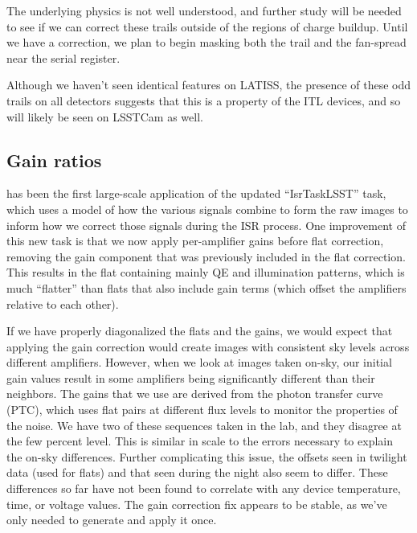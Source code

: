 The underlying physics is not well understood, and further study will be needed to see if we can correct these trails outside of the regions of charge buildup.
Until we have a correction, we plan to begin masking both the trail and the fan-spread near the serial register.

Although we haven't seen identical features on LATISS, the presence of these odd trails on all \ComCam detectors suggests that this is a property of the ITL devices, and so will likely be seen on LSSTCam as well.


\subsection{Gain ratios}

\ComCam has been the first large-scale application of the updated ``IsrTaskLSST'' task, which uses a model of how the various signals combine to form the raw images to inform how we correct those signals during the ISR process.
One improvement of this new task is that we now apply per-amplifier gains before flat correction, removing the gain component that was previously included in the flat correction.
This results in the flat containing mainly QE and illumination patterns, which is much ``flatter'' than flats that also include gain terms (which offset the amplifiers relative to each other).


If we have properly diagonalized the flats and the gains, we would expect that applying the gain correction would create images with consistent sky levels across different amplifiers.
However, when we look at images taken on-sky, our initial gain values result in some amplifiers being significantly different than their neighbors.
The gains that we use are derived from the photon transfer curve (PTC), which uses flat pairs at different flux levels to monitor the properties of the noise.
We have two of these sequences taken in the lab, and they disagree at the few percent level.
This is similar in scale to the errors necessary to explain the on-sky differences.
Further complicating this issue, the offsets seen in twilight data (used for flats) and that seen during the night also seem to differ.
These differences so far have not been found to correlate with any device temperature, time, or voltage values.
The gain correction fix appears to be stable, as we've only needed to generate and apply it once.

